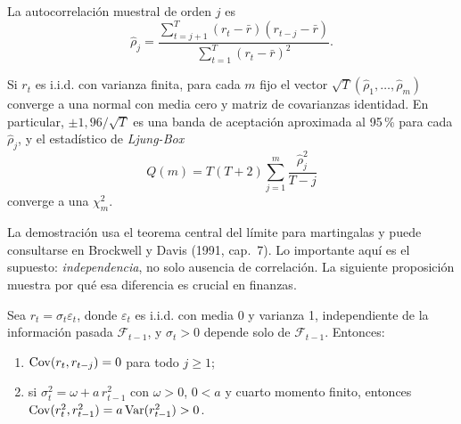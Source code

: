 \begin{definicion}
La autocorrelación muestral de orden $j$ es
\[
  \hat\rho_j=\frac{\sum_{t=j+1}^T(r_t-\bar r)(r_{t-j}-\bar r)}{\sum_{t=1}^T(r_t-\bar r)^2}.
\]
\end{definicion}

\begin{teorema}[Bartlett]\label{teo:bartlett}
Si $r_t$ es i.i.d. con varianza finita, para cada $m$ fijo el vector
$\sqrt T(\hat\rho_1,\dots,\hat\rho_m)$ converge a una normal con media cero y matriz de covarianzas
identidad. En particular, $\pm1{,}96/\sqrt T$ es una banda de aceptación aproximada al 95\,\% para cada
$\hat\rho_j$, y el estadístico de \emph{Ljung-Box}
\[
  Q(m)=T(T+2)\sum_{j=1}^m\frac{\hat\rho_j^2}{T-j}
\]
converge a una $\chi^2_m$.
\end{teorema}

La demostración usa el teorema central del límite para martingalas y puede consultarse en Brockwell y
Davis (1991, cap.~7). Lo importante aquí es el supuesto: \emph{independencia}, no solo ausencia de
correlación. La siguiente proposición muestra por qué esa diferencia es crucial en finanzas.

\begin{proposicion}\label{prop:mds}
Sea $r_t=\sigma_t\varepsilon_t$, donde $\varepsilon_t$ es i.i.d. con media 0 y varianza 1, independiente
de la información pasada $\mathcal F_{t-1}$, y $\sigma_t>0$ depende solo de $\mathcal F_{t-1}$. Entonces:
\begin{enumerate}[label=(\alph*)]
  \item $\operatorname{Cov}(r_t,r_{t-j})=0$ para todo $j\ge1$;
  \item si $\sigma_t^2=\omega+a\,r_{t-1}^2$ con $\omega>0$, $0<a$ y cuarto momento finito, entonces
        $\operatorname{Cov}(r_t^2,r_{t-1}^2)=a\operatorname{Var}(r_{t-1}^2)>0$.
\end{enumerate}
\end{proposicion}

